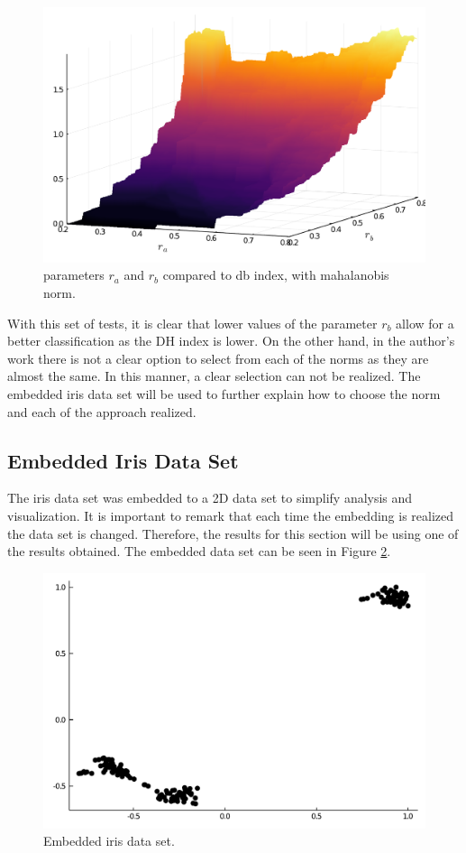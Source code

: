 \documentclass[conference]{IEEEtran}
\theoremstyle{definition}
\theoremstyle{remark}
\theoremstyle{remark}
\begin{document}
\begin{figure}[t]
  \centering
  \includegraphics[scale=.35]{figs/iris/exploring-3d-mah}
  \caption{parameters $r_{a}$ and $r_{b}$ compared to db index, with mahalanobis
    norm.}
  \label{fig:exp3dmah}
\end{figure}

With this set of tests, it is clear that lower values of the parameter $r_{b}$
allow for a better classification as the DH index is lower. On the other hand,
in the author's work there is not a clear option to select from each of the
norms as they are almost the same. In this manner, a clear selection can not be
realized. The embedded iris data set will be used to further explain how to
choose the norm and each of the approach realized.

\subsection{Embedded Iris Data Set}

The iris data set was embedded to a 2D data set to simplify analysis and
visualization. It is important to remark that each time the embedding is
realized the data set is changed. Therefore, the results for this section will
be using one of the results obtained. The embedded data set can be seen in
Figure \ref{fig:embdata}.

\begin{figure}[t]
  \centering
  \includegraphics[scale=.35]{figs/iris/embedded-data-set}
  \caption{Embedded iris data set.}
  \label{fig:embdata}
\end{figure}
\end{document}
